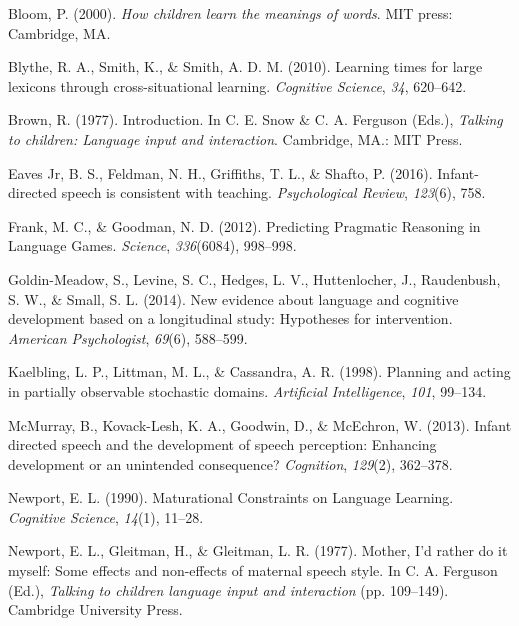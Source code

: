 \documentclass[10pt, letterpaper]{article}
\begin{document}
\noindent

\hypertarget{refs}{}
\leavevmode\hypertarget{ref-bloom2000}{}%
Bloom, P. (2000). \emph{How children learn the meanings of words}. MIT
press: Cambridge, MA.

\leavevmode\hypertarget{ref-blythe2010}{}%
Blythe, R. A., Smith, K., \& Smith, A. D. M. (2010). Learning times for
large lexicons through cross-situational learning. \emph{Cognitive
Science}, \emph{34}, 620--642.

\leavevmode\hypertarget{ref-brown1977}{}%
Brown, R. (1977). Introduction. In C. E. Snow \& C. A. Ferguson (Eds.),
\emph{Talking to children: Language input and interaction}. Cambridge,
MA.: MIT Press.

\leavevmode\hypertarget{ref-eaves-jr2016}{}%
Eaves Jr, B. S., Feldman, N. H., Griffiths, T. L., \& Shafto, P. (2016).
Infant-directed speech is consistent with teaching. \emph{Psychological
Review}, \emph{123}(6), 758.

\leavevmode\hypertarget{ref-frank2012}{}%
Frank, M. C., \& Goodman, N. D. (2012). Predicting Pragmatic Reasoning
in Language Games. \emph{Science}, \emph{336}(6084), 998--998.

\leavevmode\hypertarget{ref-goldin-meadow2014}{}%
Goldin-Meadow, S., Levine, S. C., Hedges, L. V., Huttenlocher, J.,
Raudenbush, S. W., \& Small, S. L. (2014). New evidence about language
and cognitive development based on a longitudinal study: Hypotheses for
intervention. \emph{American Psychologist}, \emph{69}(6), 588--599.

\leavevmode\hypertarget{ref-kaelbling1998}{}%
Kaelbling, L. P., Littman, M. L., \& Cassandra, A. R. (1998). Planning
and acting in partially observable stochastic domains. \emph{Artificial
Intelligence}, \emph{101}, 99--134.

\leavevmode\hypertarget{ref-mcmurray2013}{}%
McMurray, B., Kovack-Lesh, K. A., Goodwin, D., \& McEchron, W. (2013).
Infant directed speech and the development of speech perception:
Enhancing development or an unintended consequence? \emph{Cognition},
\emph{129}(2), 362--378.

\leavevmode\hypertarget{ref-newport1990}{}%
Newport, E. L. (1990). Maturational Constraints on Language Learning.
\emph{Cognitive Science}, \emph{14}(1), 11--28.

\leavevmode\hypertarget{ref-newport1977}{}%
Newport, E. L., Gleitman, H., \& Gleitman, L. R. (1977). Mother, I'd
rather do it myself: Some effects and non-effects of maternal speech
style. In C. A. Ferguson (Ed.), \emph{Talking to children language input
and interaction} (pp. 109--149). Cambridge University Press.
\end{document}
